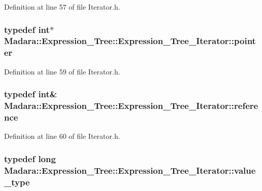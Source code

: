 Definition at line 57 of file Iterator.h.

\hypertarget{classMadara_1_1Expression__Tree_1_1Expression__Tree__Iterator_a00e18daf5f2eb499896745ec95fb205e}{
\subsubsection[{pointer}]{\setlength{\rightskip}{0pt plus 5cm}typedef int$\ast$ {\bf Madara::Expression\_\-Tree::Expression\_\-Tree\_\-Iterator::pointer}}}
\label{d2/d83/classMadara_1_1Expression__Tree_1_1Expression__Tree__Iterator_a00e18daf5f2eb499896745ec95fb205e}


Definition at line 59 of file Iterator.h.

\hypertarget{classMadara_1_1Expression__Tree_1_1Expression__Tree__Iterator_affb903c7cd4733ef3886f449d68e6024}{
\subsubsection[{reference}]{\setlength{\rightskip}{0pt plus 5cm}typedef int\& {\bf Madara::Expression\_\-Tree::Expression\_\-Tree\_\-Iterator::reference}}}
\label{d2/d83/classMadara_1_1Expression__Tree_1_1Expression__Tree__Iterator_affb903c7cd4733ef3886f449d68e6024}


Definition at line 60 of file Iterator.h.

\hypertarget{classMadara_1_1Expression__Tree_1_1Expression__Tree__Iterator_abd8df8a3b61fd2efd3597d217cd1d526}{
\subsubsection[{value\_\-type}]{\setlength{\rightskip}{0pt plus 5cm}typedef long {\bf Madara::Expression\_\-Tree::Expression\_\-Tree\_\-Iterator::value\_\-type}}}
\label{d2/d83/classMadara_1_1Expression__Tree_1_1Expression__Tree__Iterator_abd8df8a3b61fd2efd3597d217cd1d526}


